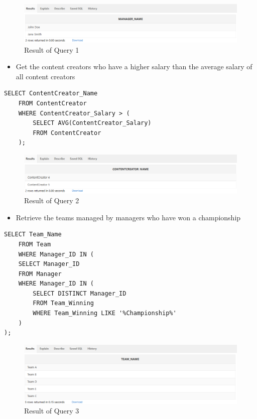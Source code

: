 \begin{figure}[H]
    \centering
    \includegraphics[width=1\textwidth]{images/dml/Subq/q1.png}
    \caption{Result of Query 1}
\end{figure}
\vspace{2cm}
\begin{itemize}
    \item Get the content creators who have a higher salary than the average salary of all content creators
\end{itemize}
\begin{lstlisting}[caption={ Query 2},label={lst:q-2}]
    SELECT ContentCreator_Name
    FROM ContentCreator
    WHERE ContentCreator_Salary > (
        SELECT AVG(ContentCreator_Salary)
        FROM ContentCreator
    );    
\end{lstlisting}
\begin{figure}[H]
    \centering
    \includegraphics[width=1\textwidth]{images/dml/Subq/q2.png}
    \caption{Result of Query 2}
\end{figure}
\clearpage
\begin{itemize}
    \item Retrieve the teams managed by managers who have won a championship
\end{itemize}
\begin{lstlisting}[caption={ Query 3},label={lst:q-3}]
    SELECT Team_Name
    FROM Team
    WHERE Manager_ID IN (
    SELECT Manager_ID
    FROM Manager
    WHERE Manager_ID IN (
        SELECT DISTINCT Manager_ID
        FROM Team_Winning
        WHERE Team_Winning LIKE '%Championship%'
    )
);
\end{lstlisting}
\begin{figure}[H]
    \centering
    \includegraphics[width=1\textwidth]{images/dml/Subq/q3.png}
    \caption{Result of Query 3}
\end{figure}
\clearpage